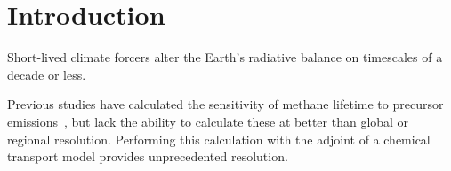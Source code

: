 \section{Introduction}

Short-lived climate forcers alter the Earth's radiative balance on timescales of a decade or less.

Previous studies have calculated the sensitivity of methane lifetime to precursor emissions~\citep{ref:holmes2013}, but lack the ability to calculate these at better than global or regional resolution. Performing this calculation with the adjoint of a chemical transport model provides unprecedented resolution.